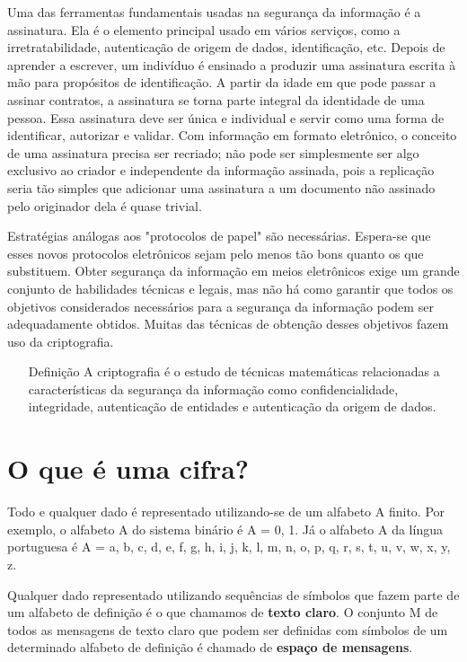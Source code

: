 \documentclass[
	10pt,				%
	openright,			%
	twoside,			%
	a5paper,			%
	english,			%
	french,				%
	spanish,			%
	brazil,				%
	sumario=tradicional
]{abntex2}
\begin{document}
Uma das ferramentas fundamentais usadas na segurança da informação é a assinatura. Ela é o elemento principal usado em vários serviços, como a irretratabilidade, autenticação de origem de dados, identificação, etc. Depois de aprender a escrever, um indivíduo é ensinado a produzir uma assinatura escrita à mão para propósitos de identificação. A partir da idade em que pode passar a assinar contratos, a assinatura se torna parte integral da identidade de uma pessoa. Essa assinatura deve ser única e individual e servir como uma forma de identificar, autorizar e validar. Com informação em formato eletrônico, o conceito de uma assinatura precisa ser recriado; não pode ser simplesmente ser algo exclusivo ao criador e independente da informação assinada, pois a replicação seria tão simples que adicionar uma assinatura a um documento não assinado pelo originador dela é quase trivial.

Estratégias análogas aos "protocolos de papel" são necessárias. Espera-se que esses novos protocolos eletrônicos sejam pelo menos tão bons quanto os que substituem. Obter segurança da informação em meios eletrônicos exige um grande conjunto de habilidades técnicas e legais, mas não há como garantir que todos os objetivos considerados necessários para a segurança da informação podem ser adequadamente obtidos. Muitas das técnicas de obtenção desses objetivos fazem uso da criptografia.

\begin{itemize}
\item[Definição] A criptografia é o estudo de técnicas matemáticas relacionadas a características da segurança da informação como confidencialidade, integridade, autenticação de entidades e autenticação da origem de dados.
\end{itemize}

\section{O que é uma cifra?}

Todo e qualquer dado é representado utilizando-se de um alfabeto A finito. Por exemplo, o alfabeto A do sistema binário é A = {0, 1}. Já o alfabeto A da língua portuguesa é A = {a, b, c, d, e, f, g, h, i, j, k, l, m, n, o, p, q, r, s, t, u, v, w, x, y, z}.

Qualquer dado representado utilizando sequências de símbolos que fazem parte de um alfabeto de definição é o que chamamos de \textbf{texto claro}. O conjunto M de todos as mensagens de texto claro que podem ser definidas com símbolos de um determinado alfabeto de definição é chamado de \textbf{espaço de mensagens}.
\end{document}
